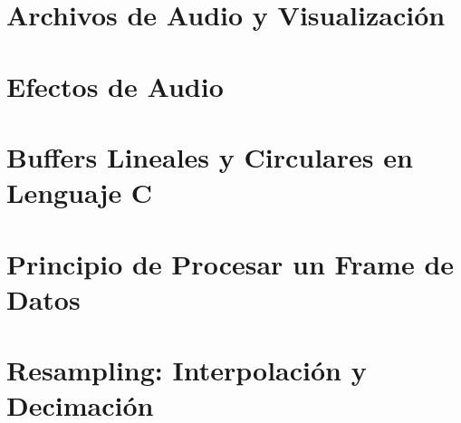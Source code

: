 \documentclass[12pt,a4paper]{article} %
\begin{document}
\tableofcontents %
\clearpage

\listoffigures %
\clearpage

\listoftables
\clearpage


\section{Archivos de Audio y Visualización}

\clearpage

\section{Efectos de Audio}

\clearpage

\section{Buffers Lineales y Circulares en Lenguaje C}

\clearpage

\section{Principio de Procesar un Frame de Datos}

\clearpage

\section{Resampling: Interpolación y Decimación}

\clearpage
\end{document}
